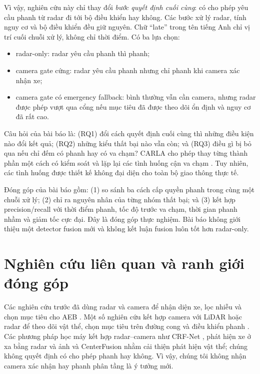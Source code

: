 \documentclass[conference]{IEEEtran}
\begin{document}
Vì vậy, nghiên cứu này chỉ thay đổi \emph{bước quyết định cuối cùng}: có cho
phép yêu cầu phanh từ radar đi tới bộ điều khiển hay không. Các bước xử lý
radar, tính nguy cơ và bộ điều khiển đều giữ nguyên. Chữ ``late'' trong tên
tiếng Anh chỉ vị trí cuối chuỗi xử lý, không chỉ thời điểm. Có ba lựa chọn:

\begin{itemize}
\item radar-only: radar yêu cầu phanh thì phanh;
\item camera gate cứng: radar yêu cầu phanh nhưng chỉ phanh khi camera xác nhận
xe;
\item camera gate có emergency fallback: bình thường vẫn cần camera, nhưng
radar được phép vượt qua cổng nếu mục tiêu đã được theo dõi ổn định và nguy cơ
đã rất cao.
\end{itemize}

Câu hỏi của bài báo là: (RQ1) đổi cách quyết định cuối cùng thì những điều kiện
nào đổi kết quả; (RQ2) những kiểu thất bại nào vẫn còn; và (RQ3) điều gì bị bỏ
qua nếu chỉ đếm có phanh hay có va chạm? CARLA cho phép thay từng thành phần
một cách có kiểm soát và lặp lại các tình huống cận va chạm
\cite{dosovitskiy2017carla,kang2019testing}. Tuy nhiên, các tình huống được
thiết kế không đại diện cho toàn bộ giao thông thực tế.

Đóng góp của bài báo gồm: (1) so sánh ba cách cấp quyền phanh trong cùng một
chuỗi xử lý; (2) chỉ ra nguyên nhân của từng nhóm thất bại; và (3) kết hợp
precision/recall với thời điểm phanh, tốc độ trước va chạm, thời gian phanh
nhầm và giảm tốc cực đại. Đây là đóng góp thực nghiệm. Bài báo không giới thiệu
một detector fusion mới và không kết luận fusion luôn tốt hơn radar-only.

\section{Nghiên cứu liên quan và ranh giới đóng góp}
Các nghiên cứu trước đã dùng radar và camera để nhận diện xe, lọc nhiễu và
chọn mục tiêu cho AEB \cite{kim2013vehicle,hsu2015noise}. Một số nghiên cứu
kết hợp camera với LiDAR hoặc radar để theo dõi vật thể, chọn mục tiêu trên
đường cong và điều khiển phanh \cite{bae2021cipv,zhang2023curved}. Các phương
pháp học máy kết hợp radar--camera như CRF-Net \cite{nobis2019crfnet}, phát
hiện xe ở xa bằng radar và ảnh \cite{chadwick2019distant} và CenterFusion
\cite{nabati2021centerfusion} nhằm cải thiện phát hiện vật thể; chúng không
quyết định có cho phép phanh hay không. Vì vậy, chúng tôi không nhận camera
xác nhận hay phanh phân tầng là ý tưởng mới.
\end{document}
